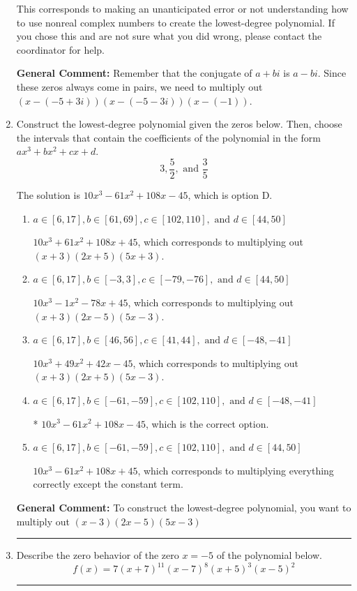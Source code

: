 \documentclass{extbook}[14pt]
\newcommand{\litem}[1]{\item #1

\rule{\textwidth}{0.4pt}}
\begin{document}
\begin{enumerate}
{\begin{enumerate}[label=\Alph*.]
This corresponds to making an unanticipated error or not understanding how to use nonreal complex numbers to create the lowest-degree polynomial. If you chose this and are not sure what you did wrong, please contact the coordinator for help.
\end{enumerate}

\textbf{General Comment:} Remember that the conjugate of $a+bi$ is $a-bi$. Since these zeros always come in pairs, we need to multiply out $(x-(-5 + 3 i))(x-(-5 - 3 i))(x-(-1))$.
}
\litem{
Construct the lowest-degree polynomial given the zeros below. Then, choose the intervals that contain the coefficients of the polynomial in the form $ax^3+bx^2+cx+d$.
\[ 3, \frac{5}{2}, \text{ and } \frac{3}{5} \]

The solution is \( 10x^{3} -61 x^{2} +108 x -45 \), which is option D.\begin{enumerate}[label=\Alph*.]
\item \( a \in [6, 17], b \in [61, 69], c \in [102, 110], \text{ and } d \in [44, 50] \)

$10x^{3} +61 x^{2} +108 x + 45$, which corresponds to multiplying out $(x + 3)(2x + 5)(5x + 3)$.
\item \( a \in [6, 17], b \in [-3, 3], c \in [-79, -76], \text{ and } d \in [44, 50] \)

$10x^{3} -1 x^{2} -78 x + 45$, which corresponds to multiplying out $(x + 3)(2x -5)(5x -3)$.
\item \( a \in [6, 17], b \in [46, 56], c \in [41, 44], \text{ and } d \in [-48, -41] \)

$10x^{3} +49 x^{2} +42 x -45$, which corresponds to multiplying out $(x + 3)(2x + 5)(5x -3)$.
\item \( a \in [6, 17], b \in [-61, -59], c \in [102, 110], \text{ and } d \in [-48, -41] \)

* $10x^{3} -61 x^{2} +108 x -45$, which is the correct option.
\item \( a \in [6, 17], b \in [-61, -59], c \in [102, 110], \text{ and } d \in [44, 50] \)

$10x^{3} -61 x^{2} +108 x + 45$, which corresponds to multiplying everything correctly except the constant term.
\end{enumerate}

\textbf{General Comment:} To construct the lowest-degree polynomial, you want to multiply out $(x -3)(2x -5)(5x -3)$
}
\litem{
Describe the zero behavior of the zero $x = -5$ of the polynomial below.
\[ f(x) = 7(x + 7)^{11}(x - 7)^{8}(x + 5)^{3}(x - 5)^{2} \]

}
\end{enumerate}
\end{document}
